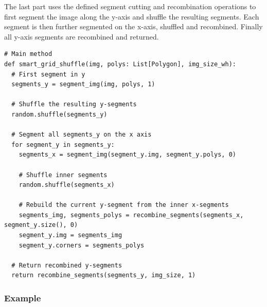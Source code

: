 \documentclass[10pt]{book}
\newenvironment{code}{\captionsetup{type=listing}}{}
\begin{document}
The last part uses the defined segment cutting and recombination operations to first segment the image along the y-axis and shuffle the resulting segments. Each segment is then further segmented on the x-axis, shuffled and recombined. Finally all y-axis segments are recombined and returned.

\begin{code}
\label{lst:sgs_main}
\begin{verbatim}
# Main method
def smart_grid_shuffle(img, polys: List[Polygon], img_size_wh):
  # First segment in y 
  segments_y = segment_img(img, polys, 1)

  # Shuffle the resulting y-segments
  random.shuffle(segments_y)

  # Segment all segments_y on the x axis
  for segment_y in segments_y:
    segments_x = segment_img(segment_y.img, segment_y.polys, 0)
    
    # Shuffle inner segments
    random.shuffle(segments_x)
    
    # Rebuild the current y-segment from the inner x-segments
    segments_img, segments_polys = recombine_segments(segments_x, segment_y.size(), 0)
    segment_y.img = segments_img
    segment_y.corners = segments_polys

  # Return recombined y-segments
  return recombine_segments(segments_y, img_size, 1)
\end{verbatim}
\end{code}

\subsubsection{Example}
\end{document}
